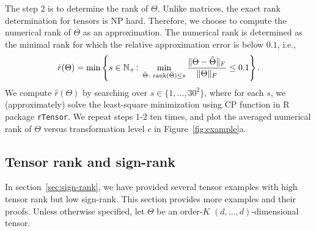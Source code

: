 \documentclass[11pt]{article}
\theoremstyle{plain}
\theoremstyle{definition}
\def\rank{\textup{rank}}
\begin{document}
The step 2 is to determine the rank of $\Theta$. Unlike matrices, the exact rank determination for tensors is NP hard. Therefore, we choose to compute the numerical rank of $\Theta$ as an approximation.  The numerical rank is determined as the minimal rank for which the relative approximation error is below $0.1$, i.e.,
\begin{equation}\label{eq:numeric}
 \hat r(\Theta)=\min\left\{s\in\mathbb{N}_{+}\colon \min_{\hat \Theta\colon \rank(\hat \Theta)\leq s}{\FnormSize{}{\Theta-\hat \Theta}\over \FnormSize{}{\Theta}} \leq 0.1\right\}.
\end{equation}
We compute $\hat r(\Theta)$ by searching over $s\in\{1,\ldots,30^2\}$, where for each $s$, we (approximately) solve the least-square minimization using CP function in R package {\tt rTensor}. 
We repeat steps 1-2 ten times, and plot the averaged numerical rank of $\Theta$ versus transformation level $c$ in Figure~\ref{fig:example}a.  

\subsection{Tensor rank and sign-rank}\label{sec:high-rank}
In section~\ref{sec:sign-rank}, we have provided several tensor examples with high tensor rank but low sign-rank. This section provides more examples and their proofs. 
Unless otherwise specified, let $\Theta$ be an order-$K$ $(d,\ldots,d)$-dimensional tensor. \\
\end{document}
